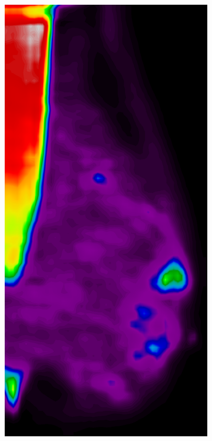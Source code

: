 \documentclass{beamer}
\begin{document}
\begin{frame}
\begin{figure}
\begin{subfigure}{0.134\textwidth}
            \end{subfigure}
            \begin{subfigure}{0.134\textwidth}
	            \centering
		            \includegraphics[width=\textwidth]{plots/examples/example1_probs_2.png}

\end{subfigure}
\end{figure}
\end{frame}
\end{document}

